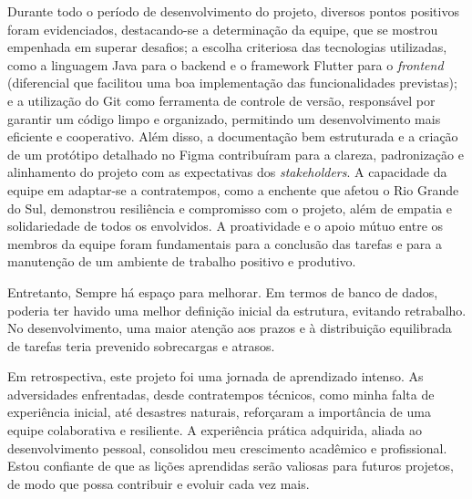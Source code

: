 Durante todo o período de desenvolvimento do projeto, diversos pontos positivos foram evidenciados, destacando-se a determinação da equipe, que se mostrou empenhada em superar desafios; a escolha criteriosa das tecnologias utilizadas, como a linguagem Java para o backend e o framework Flutter para o \textit{frontend} (diferencial que facilitou uma boa implementação das funcionalidades previstas); e a utilização do Git como ferramenta de controle de versão, responsável por garantir um código limpo e organizado, permitindo um desenvolvimento mais eficiente e cooperativo. Além disso, a documentação bem estruturada e a criação de um protótipo detalhado no Figma contribuíram para a clareza, padronização e alinhamento do projeto com as expectativas dos \textit{stakeholders}. A capacidade da equipe em adaptar-se a contratempos, como a enchente que afetou o Rio Grande do Sul, demonstrou resiliência e compromisso com o projeto, além de empatia e solidariedade de todos os envolvidos. A proatividade e o apoio mútuo entre os membros da equipe foram fundamentais para a conclusão das tarefas e para a manutenção de um ambiente de trabalho positivo e produtivo.

Entretanto, Sempre há espaço para melhorar. Em termos de banco de dados, poderia ter havido uma melhor definição inicial da estrutura, evitando retrabalho. No desenvolvimento, uma maior atenção aos prazos e à distribuição equilibrada de tarefas teria prevenido sobrecargas e atrasos. 

Em retrospectiva, este projeto foi uma jornada de aprendizado intenso. As adversidades enfrentadas, desde contratempos técnicos, como minha falta de experiência inicial, até desastres naturais, reforçaram a importância de uma equipe colaborativa e resiliente. A experiência prática adquirida, aliada ao desenvolvimento pessoal, consolidou meu crescimento acadêmico e profissional. Estou confiante de que as lições aprendidas serão valiosas para futuros projetos, de modo que possa contribuir e evoluir cada vez mais. 
